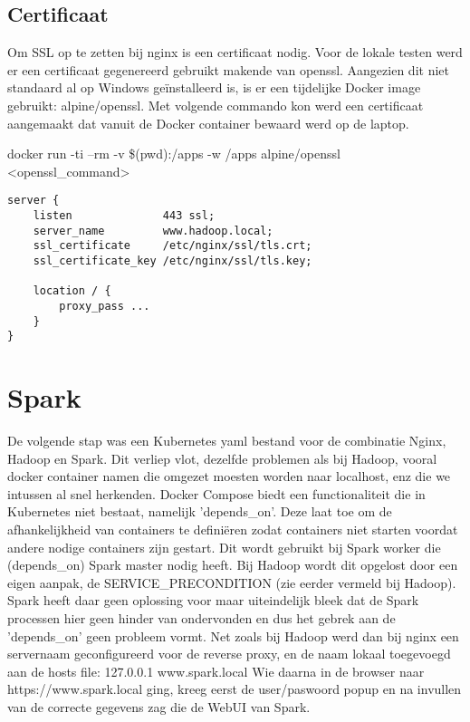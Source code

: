 \subsection{Certificaat}

Om SSL op te zetten bij nginx is een certificaat nodig. Voor de lokale testen werd er een certificaat gegenereerd gebruikt makende van openssl. Aangezien dit niet standaard al op Windows geïnstalleerd is, is er een tijdelijke Docker image gebruikt: alpine/openssl.
\newline
\newline
Met volgende commando kon werd een certificaat aangemaakt dat vanuit de Docker container bewaard werd op de laptop.
\newline
\newline

docker run -ti --rm -v \$(pwd):/apps -w /apps alpine/openssl <openssl\_command>

\begin{lstlisting}
server {
    listen              443 ssl;
    server_name         www.hadoop.local;
    ssl_certificate     /etc/nginx/ssl/tls.crt;
    ssl_certificate_key /etc/nginx/ssl/tls.key;
    
    location / {
        proxy_pass ...
    }
}
\end{lstlisting}

\section{Spark}

De volgende stap was een Kubernetes yaml bestand voor de combinatie Nginx, Hadoop en Spark. Dit verliep vlot, dezelfde problemen als bij Hadoop, vooral docker container namen die omgezet moesten worden naar localhost, enz die we intussen al snel herkenden.
\newline
\newline
Docker Compose biedt een functionaliteit die in Kubernetes niet bestaat, namelijk 'depends\_on'. Deze laat toe om de afhankelijkheid van containers te definiëren zodat containers niet starten voordat andere nodige containers zijn gestart. Dit wordt gebruikt bij Spark worker die (depends\_on) Spark master nodig heeft.
Bij Hadoop wordt dit opgelost door een eigen aanpak, de SERVICE\_PRECONDITION (zie eerder vermeld bij Hadoop).
\newline
\newline
Spark heeft daar geen oplossing voor maar uiteindelijk bleek dat de Spark processen hier geen hinder van ondervonden en dus het gebrek aan de 'depends\_on' geen probleem vormt.
\newline
\newline
Net zoals bij Hadoop werd dan bij nginx een servernaam geconfigureerd voor de reverse proxy, en de naam lokaal toegevoegd aan de hosts file:
127.0.0.1 www.spark.local
\newline
\newline
Wie daarna in de browser naar https://www.spark.local ging, kreeg eerst de user/paswoord popup en na invullen van de correcte gegevens zag die de WebUI van Spark.

